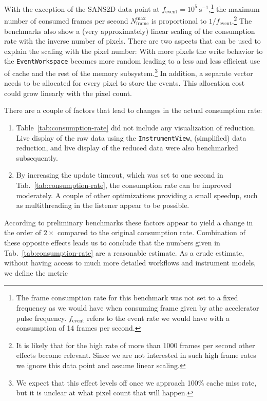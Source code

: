 \documentclass[a4paper,english,numbers=noenddot,bibliography=totoc,chapterprefix=on,DIV=12]{scrartcl}
\newcommand{\Fevent}{f_{\text{event}}}
\begin{document}
With the exception of the SANS2D data point at $\Fevent = 10^5~\mathrm{s}^{-1}$,\footnote{The frame consumption rate for this benchmark was not set to a fixed frequency as we would have when consuming frame given by athe accelerator pulse frequency. $\Fevent$ refers to the event rate we would have with a consumption of 14 frames per second.} the maximum number of consumed frames per second $N_{\text{frame}}^{\text{max}}$ is proportional to $1/\Fevent$.\footnote{It is likely that for the high rate of more than 1000 frames per second other effects become relevant. Since we are not interested in such high frame rates we ignore this data point and assume linear scaling.}
The benchmarks also show a (very approximately) linear scaling of the consumption rate with the inverse number of pixels.
There are two aspects that can be used to explain the scaling with the pixel number:
With more pixels the write behavior to the \verb|EventWorkspace| becomes more random leading to a less and less efficient use of cache and the rest of the memory subsystem.\footnote{We expect that this effect levels off once we approach 100\% cache miss rate, but it is unclear at what pixel count that will happen.}
In addition, a separate vector needs to be allocated for every pixel to store the events.
This allocation cost could grow linearly with the pixel count.

There are a couple of factors that lead to changes in the actual consumption rate:

\begin{enumerate}
  \item
    Table~\ref{tab:consumption-rate} did not include any visualization of reduction.
    Live display of the raw data using the \verb|InstrumentView|, (simplified) data reduction, and live display of the reduced data were also benchmarked subsequently.
  \item
    By increasing the update timeout, which was set to one second in Tab.~\ref{tab:consumption-rate}, the consumption rate can be improved moderately.
    A couple of other optimizations providing a small speedup, such as multithreading in the listener appear to be possible.
\end{enumerate}
According to preliminary benchmarks these factors appear to yield a change in the order of $2\times$ compared to the original consumption rate.
Combination of these opposite effects leads us to conclude that the numbers given in Tab.~\ref{tab:consumption-rate} are a reasonable estimate.
As a crude estimate, without having access to much more detailed workflows and instrument models, we define the metric
\end{document}
